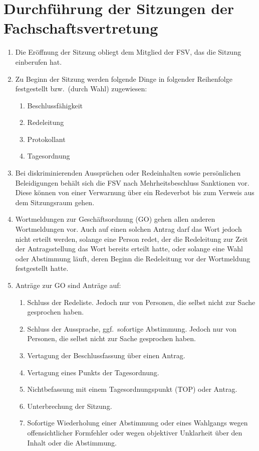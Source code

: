 \section{Durchführung der Sitzungen der Fachschaftsvertretung}
\label{sec:sitzung_durchfuehrung}
\begin{enumerate}
	\item Die Eröffnung der Sitzung obliegt dem Mitglied der FSV, das die Sitzung einberufen hat.
	\item Zu Beginn der Sitzung werden folgende Dinge in folgender Reihenfolge festgestellt bzw.\ (durch Wahl) zugewiesen:
	\begin{enumerate}
		\item Beschlussfähigkeit
		\item Redeleitung
		\item Protokollant
		\item Tagesordnung
	\end{enumerate}
	\item Bei diskriminierenden Aussprüchen oder Redeinhalten sowie persönlichen Beleidigungen behält sich die FSV nach Mehrheitsbeschluss Sanktionen vor.
	Diese können von einer Verwarnung über ein Redeverbot bis zum Verweis aus dem Sitzungsraum gehen.
	\item Wortmeldungen zur Geschäftsordnung (GO) gehen allen anderen Wortmeldungen vor.
	Auch auf einen solchen Antrag darf das Wort jedoch nicht erteilt werden, solange eine Person redet, der die Redeleitung zur Zeit der Antragsstellung das Wort bereits erteilt hatte, oder solange eine Wahl oder Abstimmung läuft, deren Beginn die Redeleitung vor der Wortmeldung festgestellt hatte.
	\item \label{item:go_antraege}
	Anträge zur GO sind Anträge auf:
	\begin{enumerate}
		\item Schluss der Redeliste.
		Jedoch nur von Personen, die selbst nicht zur Sache gesprochen haben.
		\item Schluss der Aussprache, ggf.\ sofortige Abstimmung.
		Jedoch nur von Personen, die selbst nicht zur Sache gesprochen haben.
		\item Vertagung der Beschlussfassung über einen Antrag.
		\item Vertagung eines Punkts der Tagesordnung.
		\item Nichtbefassung mit einem Tagesordnungspunkt (TOP) oder Antrag.
		\item Unterbrechung der Sitzung.
		\item Sofortige Wiederholung einer Abstimmung oder eines Wahlgangs wegen offensichtlicher Formfehler oder wegen objektiver Unklarheit über den Inhalt oder die Abstimmung.

\end{enumerate}
\end{enumerate}

